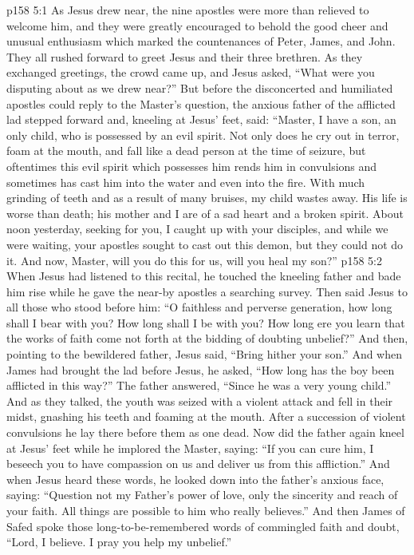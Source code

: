 \vs p158 5:1 As Jesus drew near, the nine apostles were more than relieved to welcome him, and they were greatly encouraged to behold the good cheer and unusual enthusiasm which marked the countenances of Peter, James, and John. They all rushed forward to greet Jesus and their three brethren. As they exchanged greetings, the crowd came up, and Jesus asked, \textcolor{ubdarkred}{“What were you disputing about as we drew near?”} But before the disconcerted and humiliated apostles could reply to the Master’s question, the anxious father of the afflicted lad stepped forward and, kneeling at Jesus’ feet, said: “Master, I have a son, an only child, who is possessed by an evil spirit. Not only does he cry out in terror, foam at the mouth, and fall like a dead person at the time of seizure, but oftentimes this evil spirit which possesses him rends him in convulsions and sometimes has cast him into the water and even into the fire. With much grinding of teeth and as a result of many bruises, my child wastes away. His life is worse than death; his mother and I are of a sad heart and a broken spirit. About noon yesterday, seeking for you, I caught up with your disciples, and while we were waiting, your apostles sought to cast out this demon, but they could not do it. And now, Master, will you do this for us, will you heal my son?”
\vs p158 5:2 When Jesus had listened to this recital, he touched the kneeling father and bade him rise while he gave the near\hyp{}by apostles a searching survey. Then said Jesus to all those who stood before him: \textcolor{ubdarkred}{“O faithless and perverse generation, how long shall I bear with you? How long shall I be with you? How long ere you learn that the works of faith come not forth at the bidding of doubting unbelief?”} And then, pointing to the bewildered father, Jesus said, \textcolor{ubdarkred}{“Bring hither your son.”} And when James had brought the lad before Jesus, he asked, \textcolor{ubdarkred}{“How long has the boy been afflicted in this way?”} The father answered, “Since he was a very young child.” And as they talked, the youth was seized with a violent attack and fell in their midst, gnashing his teeth and foaming at the mouth. After a succession of violent convulsions he lay there before them as one dead. Now did the father again kneel at Jesus’ feet while he implored the Master, saying: “If you can cure him, I beseech you to have compassion on us and deliver us from this affliction.” And when Jesus heard these words, he looked down into the father’s anxious face, saying: \textcolor{ubdarkred}{“Question not my Father’s power of love, only the sincerity and reach of your faith. All things are possible to him who really believes.”} And then James of Safed spoke those long\hyp{}to\hyp{}be\hyp{}remembered words of commingled faith and doubt, “Lord, I believe. I pray you help my unbelief.”
